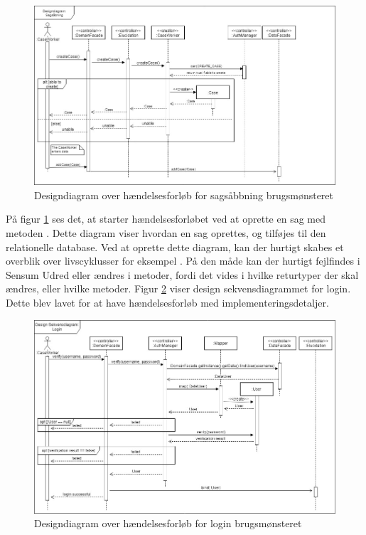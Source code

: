\documentclass[../../main.tex]{subfiles}
\begin{document}
\begin{figure}[H]
  \centering
  \includegraphics[scale=.45]{figurer/Sags_aabning_design.jpg}
  \caption{Designdiagram over hændelsesforløb for sagsåbbning brugsmønsteret}
  \label{fig:sags_aabning_design}
\end{figure}

På figur \ref{fig:sags_aabning_design} ses det, at  starter hændelsesforløbet ved at oprette en sag med metoden . Dette diagram viser hvordan en sag oprettes, og tilføjes til den relationelle database. Ved at oprette dette diagram, kan der hurtigt skabes et overblik over livscyklusser for eksempel . På den måde kan der hurtigt fejlfindes i Sensum Udred eller ændres i metoder, fordi det vides i hvilke returtyper der skal ændres, eller hvilke metoder. Figur \ref{fig:login_design} viser design sekvensdiagrammet for login. Dette blev lavet for at have hændelsesforløb med implementeringsdetaljer.

\begin{figure}[H]
  \centering
  \includegraphics[scale=.45]{figurer/Login-Design-Sekvensdiagram.jpg}
  \caption{Designdiagram over hændelsesforløb for login brugsmønsteret}
  \label{fig:login_design}
\end{figure}
\end{document}
